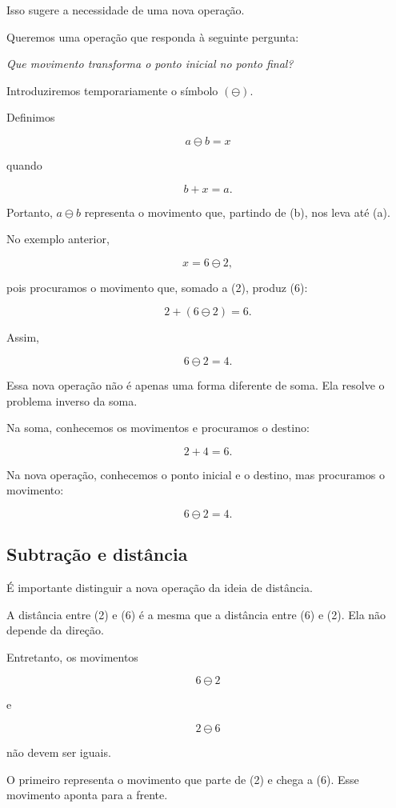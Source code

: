 \documentclass[12pt,a4paper]{article}
\begin{document}
Isso sugere a necessidade de uma nova operação.

Queremos uma operação que responda à seguinte pergunta:

\begin{center}
\emph{Que movimento transforma o ponto inicial no ponto final?}
\end{center}

Introduziremos temporariamente o símbolo $(\ominus)$.

Definimos

\[
a\ominus b=x
\]

quando

\[
b+x=a.
\]

Portanto, $a\ominus b$ representa o movimento que, partindo de (b),
nos leva até (a).

No exemplo anterior,

\[
x=6\ominus2,
\]

pois procuramos o movimento que, somado a (2), produz (6):

\[
2+(6\ominus2)=6.
\]

Assim,

\[
6\ominus2=4.
\]

Essa nova operação não é apenas uma forma diferente de soma. Ela resolve
o problema inverso da soma.

Na soma, conhecemos os movimentos e procuramos o destino:

\[
2+4=6.
\]

Na nova operação, conhecemos o ponto inicial e o destino, mas procuramos
o movimento:

\[
6\ominus2=4.
\]

\subsection{Subtração e distância}

É importante distinguir a nova operação da ideia de distância.

A distância entre (2) e (6) é a mesma que a distância entre (6) e
(2). Ela não depende da direção.

Entretanto, os movimentos

\[
6\ominus2
\]

e

\[
2\ominus6
\]

não devem ser iguais.

O primeiro representa o movimento que parte de (2) e chega a (6).
Esse movimento aponta para a frente.
\end{document}
